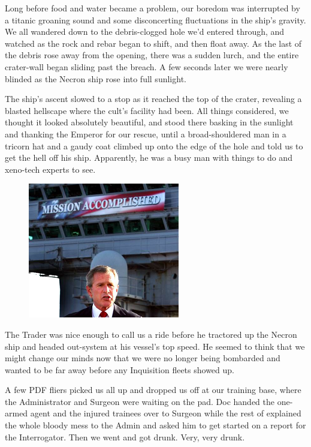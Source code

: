 Long before food and water became a problem, our boredom was interrupted by a titanic groaning sound and some disconcerting fluctuations in the ship’s gravity. 
We all wandered down to the debris-clogged hole we’d entered through, and watched as the rock and rebar began to shift, and then float away. 
As the last of the debris rose away from the opening, there was a sudden lurch, and the entire crater-wall began sliding past the breach. 
A few seconds later we were nearly blinded as the Necron ship rose into full sunlight.

The ship’s ascent slowed to a stop as it reached the top of the crater, revealing a blasted hellscape where the cult’s facility had been. 
All things considered, we thought it looked absolutely beautiful, and stood there basking in the sunlight and thanking the Emperor for our rescue, until a broad-shouldered man in a tricorn hat and a gaudy coat climbed up onto the edge of the hole and told us to get the hell off his ship. 
Apparently, he was a busy man with things to do and xeno-tech experts to see.

\begin{figure}
	\begin{center}
		\includegraphics[width=\figwidth]{pics/8/60.png}
	\end{center}
\end{figure}
The Trader was nice enough to call us a ride before he tractored up the Necron ship and headed out-system at his vessel’s top speed. 
He seemed to think that we might change our minds now that we were no longer being bombarded and wanted to be far away before any Inquisition fleets showed up.

A few PDF fliers picked us all up and dropped us off at our training base, where the Administrator and Surgeon were waiting on the pad. 
Doc handed the one-armed agent and the injured trainees over to Surgeon while the rest of explained the whole bloody mess to the Admin and asked him to get started on a report for the Interrogator. 
Then we went and got drunk. 
Very, very drunk.

